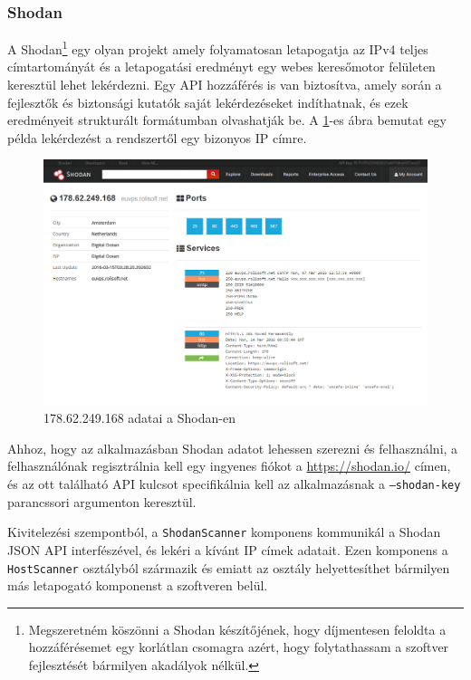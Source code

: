 \documentclass[a4paper,12pt]{article}
\begin{document}
\subsubsection{Shodan} \label{ssec:shodan}

	A Shodan\footnote{Megszeretném köszönni a Shodan készítőjének, hogy díjmentesen feloldta a hozzáférésemet egy korlátlan csomagra azért, hogy folytathassam a szoftver fejlesztését bármilyen akadályok nélkül.}\cite{shodan16} egy olyan projekt amely folyamatosan letapogatja az IPv4 teljes címtartományát és a letapogatási eredményt egy webes keresőmotor felületen keresztül lehet lekérdezni. Egy API hozzáférés is van biztosítva, amely során a fejlesztők és biztonsági kutatók saját lekérdezéseket indíthatnak, és ezek eredményeit strukturált formátumban olvashatják be. A \ref{shodanscr}-es ábra bemutat egy példa lekérdezést a rendszertől egy bizonyos IP címre.

	\begin{figure}[!htbp]
		\centering
		\includegraphics[scale=0.355]{shodan.png}
		\caption{178.62.249.168 adatai a Shodan-en}
		\label{shodanscr}
	\end{figure}
	
	Ahhoz, hogy az alkalmazásban Shodan adatot lehessen szerezni és felhasználni, a felhasználónak regisztrálnia kell egy ingyenes fiókot a \url{https://shodan.io/} címen, és az ott található API kulcsot specifikálnia kell az alkalmazásnak a \texttt{--shodan-key} parancssori argumenton keresztül.
	
	Kivitelezési szempontból, a \texttt{ShodanScanner} komponens kommunikál a Shodan JSON API interfészével, és lekéri a kívánt IP címek adatait. Ezen komponens a \texttt{HostScanner} osztályból származik és emiatt az osztály helyettesíthet bármilyen más letapogató komponenst a szoftveren belül.
\end{document}
